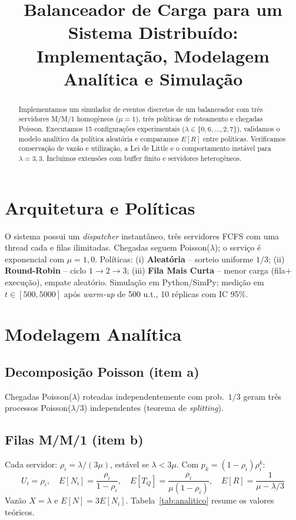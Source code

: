 \documentclass[conference]{IEEEtran}
\title{Balanceador de Carga para um Sistema Distribuído:\\
Implementação, Modelagem Analítica e Simulação}
\author{\IEEEauthorblockN{Integrante1 \and Integrante2}
\IEEEauthorblockA{MC714 -- Sistemas Distribuídos\\
Instituto de Computação -- UNICAMP}}
\begin{document}
\maketitle

\begin{abstract}
Implementamos um simulador de eventos discretos de um balanceador com três servidores M/M/1 homogêneos ($\mu=1$), três políticas de roteamento e chegadas Poisson. Executamos 15 configurações experimentais ($\lambda \in \{0{,}6,\ldots,2{,}7\}$), validamos o modelo analítico da política aleatória e comparamos $E[R]$ entre políticas. Verificamos conservação de vazão e utilização, a Lei de Little e o comportamento instável para $\lambda=3{,}3$. Incluímos extensões com buffer finito e servidores heterogêneos.
\end{abstract}

\section{Arquitetura e Políticas}
O sistema possui um \emph{dispatcher} instantâneo, três servidores FCFS com uma thread cada e filas ilimitadas. Chegadas seguem Poisson($\lambda$); o serviço é exponencial com $\mu=1{,}0$. Políticas: (i) \textbf{Aleatória} -- sorteio uniforme $1/3$; (ii) \textbf{Round-Robin} -- ciclo $1\!\rightarrow\!2\!\rightarrow\!3$; (iii) \textbf{Fila Mais Curta} -- menor carga (fila$+$execução), empate aleatório. Simulação em Python/SimPy; medição em $t \in [500,5000]$ após \emph{warm-up} de 500 u.t., 10 réplicas com IC 95\%.

\section{Modelagem Analítica}

\subsection{Decomposição Poisson (item a)}
Chegadas Poisson($\lambda$) roteadas independentemente com prob.\ $1/3$ geram três processos Poisson($\lambda/3$) independentes (teorema de \emph{splitting}).

\subsection{Filas M/M/1 (item b)}
Cada servidor: $\rho_i=\lambda/(3\mu)$, estável se $\lambda<3\mu$. Com $p_k=(1-\rho_i)\rho_i^k$:
\begin{equation}
U_i=\rho_i,\quad E[N_i]=\frac{\rho_i}{1-\rho_i},\quad E[T_Q]=\frac{\rho_i}{\mu(1-\rho_i)},\quad E[R]=\frac{1}{\mu-\lambda/3}
\end{equation}
Vazão $X=\lambda$ e $E[N]=3E[N_i]$. Tabela~\ref{tab:analitico} resume os valores teóricos.
\end{document}
